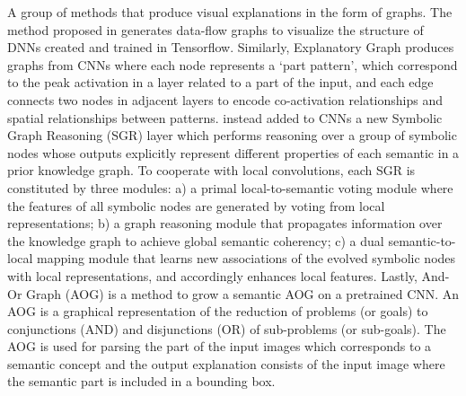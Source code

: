 \documentclass[final,1p,times]{elsarticle}
\begin{document}
A group of methods that produce visual explanations in the form of graphs. The method proposed in \cite{wongsuphasawat2018visualizing} generates data-flow graphs to visualize the structure of DNNs created and trained in Tensorflow. Similarly, Explanatory Graph \cite{zhang2018interpreting} produces graphs from CNNs where each node represents a `part pattern', which correspond to the peak activation in a layer related to a part of the input, and each edge connects two nodes in adjacent layers to encode co-activation relationships and spatial relationships between patterns. \cite{liang2018symbolic} instead added to CNNs a new Symbolic Graph Reasoning (SGR) layer which performs reasoning over a group of symbolic nodes whose outputs explicitly represent different properties of each semantic in a prior knowledge graph. To cooperate with local convolutions, each SGR is constituted by three modules: a) a primal local-to-semantic voting module where the features of all symbolic nodes are generated by voting from local representations; b) a graph reasoning module that propagates information over the knowledge graph to achieve global semantic coherency; c) a dual semantic-to-local mapping module that learns new associations of the evolved symbolic nodes with local representations, and accordingly enhances local features.
Lastly, And-Or Graph (AOG) \cite{zhang2017growing} is a method to grow a semantic AOG on a pretrained CNN. An AOG is a graphical representation of the reduction of problems (or goals) to conjunctions (AND) and disjunctions (OR) of sub-problems (or sub-goals). The AOG is used for parsing the part of the input images which corresponds to a semantic concept and the output explanation consists of the input image where the semantic part is included in a bounding box. 
\end{document}
